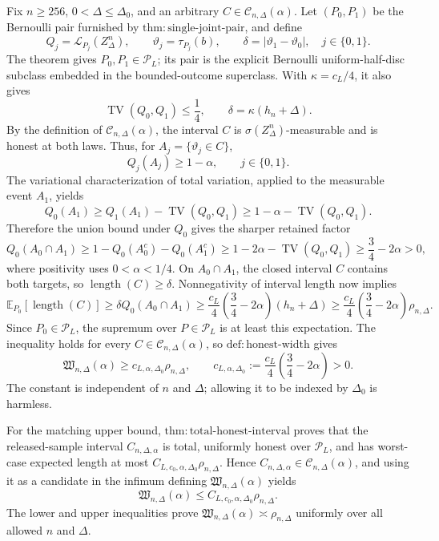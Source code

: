 Fix \(n\geq256\), \(0<\Delta\leq\Delta_0\), and an arbitrary \(C\in\mathcal C_{n,\Delta}(\alpha)\).  Let \((P_0,P_1)\) be the Bernoulli pair furnished by \(\mathrm{thm:single\text{-}joint\text{-}pair}\), and define
\[
 Q_j=\mathcal L_{P_j}(Z_\Delta^n),
 \qquad
 \vartheta_j=\tau_{P_j}(b),
 \qquad
 \delta=|\vartheta_1-\vartheta_0|,
 \quad j\in\{0,1\}.
\]
The theorem gives \(P_0,P_1\in\mathcal P_L\); its pair is the explicit Bernoulli uniform-half-disc subclass embedded in the bounded-outcome superclass.  With \(\kappa=c_L/4\), it also gives
\[
 \operatorname{TV}(Q_0,Q_1)\leq\frac14,
 \qquad
 \delta=\kappa(h_n+\Delta).
\]
By the definition of \(\mathcal C_{n,\Delta}(\alpha)\), the interval \(C\) is \(\sigma(Z_\Delta^n)\)-measurable and is honest at both laws.  Thus, for \(A_j=\{\vartheta_j\in C\}\),
\[
 Q_j(A_j)\geq1-\alpha,
 \qquad j\in\{0,1\}.
\]
The variational characterization of total variation, applied to the measurable event \(A_1\), yields
\[
 Q_0(A_1)\geq Q_1(A_1)-\operatorname{TV}(Q_0,Q_1)
 \geq1-\alpha-\operatorname{TV}(Q_0,Q_1).
\]
Therefore the union bound under \(Q_0\) gives the sharper retained factor
\[
 Q_0(A_0\cap A_1)
 \geq1-Q_0(A_0^c)-Q_0(A_1^c)
 \geq1-2\alpha-\operatorname{TV}(Q_0,Q_1)
 \geq\frac34-2\alpha>0,
\]
where positivity uses \(0<\alpha<1/4\).  On \(A_0\cap A_1\), the closed interval \(C\) contains both targets, so \(\operatorname{length}(C)\geq\delta\).  Nonnegativity of interval length now implies
\[
 \mathbb E_{P_0}[\operatorname{length}(C)]
 \geq\delta Q_0(A_0\cap A_1)
 \geq\frac{c_L}{4}\left(\frac34-2\alpha\right)(h_n+\Delta)
 \geq\frac{c_L}{4}\left(\frac34-2\alpha\right)\rho_{n,\Delta}.
\]
Since \(P_0\in\mathcal P_L\), the supremum over \(P\in\mathcal P_L\) is at least this expectation.  The inequality holds for every \(C\in\mathcal C_{n,\Delta}(\alpha)\), so \(\mathrm{def:honest\text{-}width}\) gives
\[
 \mathfrak W_{n,\Delta}(\alpha)
 \geq c_{L,\alpha,\Delta_0}\rho_{n,\Delta},
 \qquad
 c_{L,\alpha,\Delta_0}:=\frac{c_L}{4}\left(\frac34-2\alpha\right)>0.
\]
The constant is independent of \(n\) and \(\Delta\); allowing it to be indexed by \(\Delta_0\) is harmless.

For the matching upper bound, \(\mathrm{thm:total\text{-}honest\text{-}interval}\) proves that the released-sample interval \(C_{n,\Delta,\alpha}\) is total, uniformly honest over \(\mathcal P_L\), and has worst-case expected length at most \(C_{L,c_0,\alpha,\Delta_0}\rho_{n,\Delta}\).  Hence \(C_{n,\Delta,\alpha}\in\mathcal C_{n,\Delta}(\alpha)\), and using it as a candidate in the infimum defining \(\mathfrak W_{n,\Delta}(\alpha)\) yields
\[
 \mathfrak W_{n,\Delta}(\alpha)
 \leq C_{L,c_0,\alpha,\Delta_0}\rho_{n,\Delta}.
\]
The lower and upper inequalities prove \(\mathfrak W_{n,\Delta}(\alpha)\asymp\rho_{n,\Delta}\) uniformly over all allowed \(n\) and \(\Delta\).